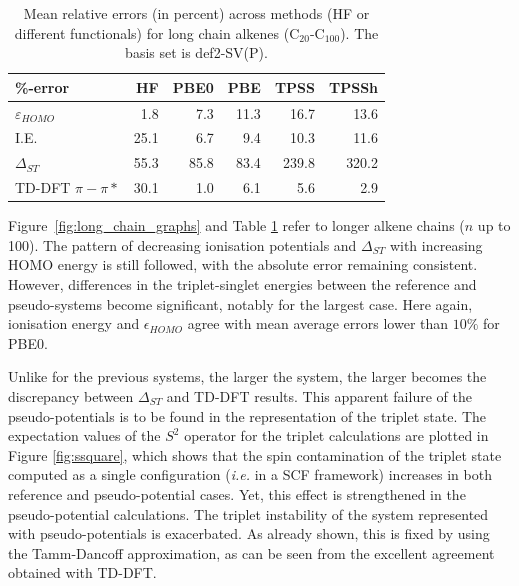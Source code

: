 \documentclass[aip]{revtex4-1}
\begin{document}
\begin{table}[ht]
\caption{Mean relative errors (in percent) across methods (HF or different functionals)
for long chain alkenes (C\(_{20}\)-C\(_{100}\)).
The basis set is def2-SV(P).}
\begin{tabular}{l r r r r r }
\hline\hline
\%-error          & HF & PBE0 & PBE & TPSS & TPSSh \\
\hline
$\varepsilon_{HOMO}$    &  1.8 &  7.3   &  11.3   &  16.7    &  13.6 \\
I.E.                    & 25.1 &  6.7   &   9.4   &  10.3    &  11.6 \\
$\Delta_{ST}$           & 55.3 & 85.8   &  83.4   & 239.8    & 320.2 \\
TD-DFT $\pi-\pi*$       & 30.1 &  1.0   &   6.1   &   5.6    &   2.9 \\ 
\hline\hline
\end{tabular}
\label{table:long_alkene_errors}
\end{table}

Figure~\ref{fig:long_chain_graphs} and Table \ref{table:long_alkene_errors} refer to longer 
alkene chains (\(n\) up to 100).
The pattern of decreasing ionisation potentials and $\Delta_{ST}$ with increasing HOMO
energy is still followed, with the absolute error remaining consistent.
However, differences in the triplet-singlet energies between the reference and pseudo-systems 
become significant, notably for the largest case.
Here again, ionisation energy and $\epsilon_{HOMO}$ agree with mean average errors lower than
$10\%$ for PBE0.

Unlike for the previous systems, the larger the system, the larger becomes the discrepancy between $\Delta_{ST}$
and TD-DFT results.
This apparent failure of the pseudo-potentials is to be found in the representation
of the triplet state.
The expectation values of the $S^2$ operator for the triplet calculations
are plotted in Figure \ref{fig:ssquare}, which shows that the spin contamination
of the triplet state computed as a single configuration (\emph{i.e.} in a SCF
framework) increases in both reference and pseudo-potential cases.
Yet, this effect is strengthened in the pseudo-potential calculations.
The triplet instability of the system represented with pseudo-potentials
is exacerbated.
As already shown, this is fixed by using the Tamm-Dancoff approximation,
as can be seen from the excellent agreement obtained with TD-DFT.\cite{tammdancoff}
\end{document}
